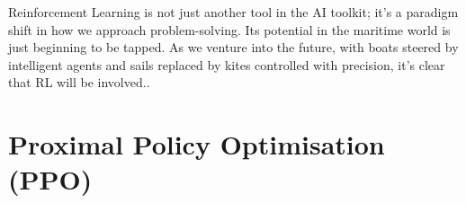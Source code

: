 Reinforcement Learning is not just another tool in the AI toolkit; it's a paradigm shift in how we approach problem-solving. Its potential in the maritime world is just beginning to be tapped. As we venture into the future, with boats steered by intelligent agents and sails replaced by kites controlled with precision, it's clear that RL will be involved.\cite{mnih2015humanlevel}.

\section{Proximal Policy Optimisation (PPO)}\label{sec:ppo_background}





